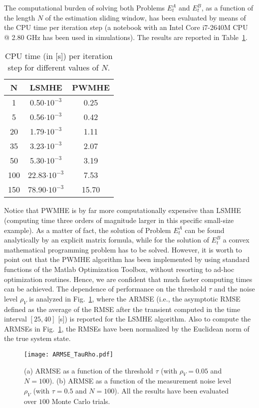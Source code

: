 \documentclass[11pt,journal,onecolumn]{IEEEtran}
\begin{document}
The computational burden of solving both Problems $E_{t}^{A}$ and $E_{t}^{B}$, as a function of the length $N$ of the estimation sliding window, has been evaluated by means of the CPU time per iteration step (a notebook with an Intel Core i7-2640M CPU @ 2.80 GHz has been used in simulations).
The results are reported in Table~\ref{table_1}.
\begin{table}[tb]
\centering
\begin{tabular}{|c|c|c|}
\hline
N               & LSMHE                   & PWMHE     \\
\hline
1               & 0.50$\cdot10^{-3}$     & 0.25      \\
5               & 0.56$\cdot10^{-3}$     & 0.42      \\
20              & 1.79$\cdot10^{-3}$     & 1.11      \\
35              & 3.23$\cdot10^{-3}$     & 2.07      \\
50              & 5.30$\cdot10^{-3}$     & 3.19      \\
100             & 22.83$\cdot10^{-3}$    & 7.53      \\
150             & 78.90$\cdot10^{-3}$    & 15.70      \\
\hline
\end{tabular}
\caption{CPU time (in [s]) per iteration step for different values of $N$.}
\label{table_1}
\end{table}
Notice that PWMHE is by far more computationally expensive than LSMHE (computing time three orders of magnitude larger in this specific small-size example). As a matter of fact, the solution of Problem $E_{t}^{A}$ can be found analytically by an explicit matrix formula, while for the solution of $E_{t}^{B}$ a convex mathematical programming problem has to be solved. However, it is worth to point out that the PWMHE algorithm has been implemented by using standard functions of the Matlab Optimization Toolbox, without resorting to ad-hoc optimization routines. Hence, we are confident that much faster computing times can be achieved. The dependence of performance on the threshold $\tau$ and the noise level $\rho_V$ is analyzed in Fig.~\ref{fig:ARMSE}, where the ARMSE (i.e., the asymptotic RMSE defined as the average of the RMSE after the transient computed in the time interval $[25,40]$ [s]) is reported for the LSMHE algorithm. Also to compute the ARMSEs in Fig.~\ref{fig:ARMSE}, the RMSEs have been normalized by the Euclidean norm of the true system state.
\begin{figure}[tb]
\centering
\texttt{[image: ARMSE\_TauRho.pdf]}
\caption{(a) ARMSE as a function of the threshold $\tau$ (with $\rho_V = 0.05$ and $N = 100$). (b) ARMSE as a function of the measurement noise level $\rho_V$ (with $\tau = 0.5$ and $N = 100$).
All the results have been evaluated over $100$ Monte Carlo trials.}
\label{fig:ARMSE}
\end{figure}
\end{document}
